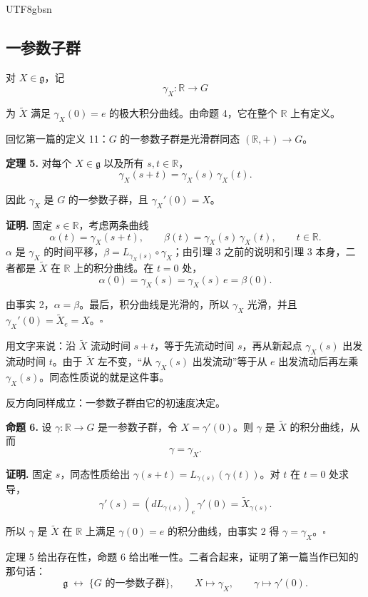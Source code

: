 \documentclass[11pt]{article}
\begin{document}
\begin{CJK*}{UTF8}{gbsn}
\subsection{一参数子群}

对 $X \in \mathfrak{g}$，记
\[
\gamma_X : \mathbb{R} \to G
\]

为 $\widetilde{X}$ 满足 $\gamma_X(0) = e$ 的极大积分曲线。由命题 4，它在整个 $\mathbb{R}$ 上有定义。

回忆第一篇的定义 11：$G$ 的一参数子群是光滑群同态 $(\mathbb{R}, +) \to G$。

\textbf{定理 5.} 对每个 $X \in \mathfrak{g}$ 以及所有 $s, t \in \mathbb{R}$，
\[
\boxed{\gamma_X(s + t) = \gamma_X(s)\, \gamma_X(t).}
\]

因此 $\gamma_X$ 是 $G$ 的一参数子群，且 $\gamma_X'(0) = X$。

\textbf{证明.} 固定 $s \in \mathbb{R}$，考虑两条曲线
\[
\alpha(t) = \gamma_X(s + t), \qquad \beta(t) = \gamma_X(s)\, \gamma_X(t), \qquad t \in \mathbb{R}.
\]
$\alpha$ 是 $\gamma_X$ 的时间平移，$\beta = L_{\gamma_X(s)} \circ \gamma_X$；由引理 3 之前的说明和引理 3 本身，二者都是 $\widetilde{X}$ 在 $\mathbb{R}$ 上的积分曲线。在 $t = 0$ 处，
\[
\alpha(0) = \gamma_X(s) = \gamma_X(s)\, e = \beta(0).
\]

由事实 2，$\alpha = \beta$。最后，积分曲线是光滑的，所以 $\gamma_X$ 光滑，并且 $\gamma_X'(0) = \widetilde{X}_e = X$。$\square$

用文字来说：沿 $\widetilde{X}$ 流动时间 $s + t$，等于先流动时间 $s$，再从新起点 $\gamma_X(s)$ 出发流动时间 $t$。由于 $\widetilde{X}$ 左不变，“从 $\gamma_X(s)$ 出发流动”等于从 $e$ 出发流动后再左乘 $\gamma_X(s)$。同态性质说的就是这件事。

反方向同样成立：一参数子群由它的初速度决定。

\textbf{命题 6.} 设 $\gamma : \mathbb{R} \to G$ 是一参数子群，令 $X = \gamma'(0)$。则 $\gamma$ 是 $\widetilde{X}$ 的积分曲线，从而
\[
\gamma = \gamma_X.
\]

\textbf{证明.} 固定 $s$，同态性质给出 $\gamma(s + t) = L_{\gamma(s)}(\gamma(t))$。对 $t$ 在 $t = 0$ 处求导，
\[
\gamma'(s) = (dL_{\gamma(s)})_e\, \gamma'(0) = \widetilde{X}_{\gamma(s)}.
\]

所以 $\gamma$ 是 $\widetilde{X}$ 在 $\mathbb{R}$ 上满足 $\gamma(0) = e$ 的积分曲线，由事实 2 得 $\gamma = \gamma_X$。$\square$

定理 5 给出存在性，命题 6 给出唯一性。二者合起来，证明了第一篇当作已知的那句话：
\[
\boxed{
\mathfrak{g}
\;\longleftrightarrow\;
\{G \text{ 的一参数子群}\},
\qquad
X \longmapsto \gamma_X, \qquad \gamma \longmapsto \gamma'(0).
}
\]


\end{CJK*}
\end{document}
